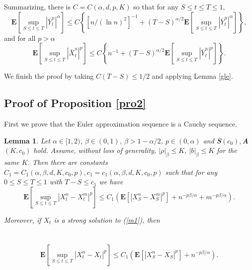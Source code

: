 \documentclass[11pt]{amsart}
\theoremstyle{plain}
\newtheorem{lemma}{Lemma}
\numberwithin{equation}{section}
\begin{document}
Summarizing, there is $C=C\left( \alpha,d ,p,K\right) $ so that for any $S\leq t\leq T\leq 1,$\begin{equation*}
\mathbf{E}\left[ \sup_{S\leq t\leq T}\left\vert \bar{Y}_{t}^{n}\right\vert
^{\alpha }\right] \leq C\left\{ \left[ n/\left( \ln n\right) ^{2}\right]
^{-1}+\left( T-S\right) ^{\alpha /2}\mathbf{E}\left[ \sup_{S\leq t\leq
T}\left\vert \bar{Y}_{t}^{n}\right\vert ^{\alpha }\right] \right\} ,
\end{equation*}and for all $p>\alpha $ 
\begin{equation*}
\mathbf{E}\left[ \sup_{S\leq t\leq T}\left\vert \bar{X}_{t}^{n}\right\vert
^{p}\right] \leq C\left\{ n^{-1}+\left( T-S\right) ^{\alpha /2}\mathbf{E}\left[ \sup_{S\leq t\leq T}\left\vert \bar{Y}_{t}^{n}\right\vert ^{p}\right]
\right\} .
\end{equation*}

We finish the proof by taking $C\left( T-S\right) \leq 1/2$ and applying
Lemma \ref{gle}.

\subsection{Proof of Proposition \protect\ref{pro2}}

First we prove that the Euler approximation sequence is a Cauchy sequence.

\begin{lemma}
\label{lem6}Let $\alpha \in \lbrack 1,2)$, $\beta \in (0,1)$, $\beta
>1-\alpha /2$, $p\in \left( 0,\alpha \right) $ and \textbf{S}$\left(
c_{0}\right) ,$\textbf{A}$(K,c_{0})$ hold. Assume, without loss of
generality, $\left\vert \rho \right\vert _{\beta }\leq K$, $\left\vert
b\right\vert _{\beta }\leq K$ for the same $K$. Then there are constants $C_{1}=C_{1}\left( \alpha ,\beta ,d,K,c_{0},p\right) ,c_{1}=c_{1}\left(
\alpha ,\beta ,d,K,c_{0},p\right) $ such that for any $0\leq S\leq T\leq 1$
with $T-S\leq c_{1}$ we have\begin{equation*}
\mathbf{E}\left[ \sup_{S\leq t\leq T}\left\vert
X_{t}^{n}-X_{t}^{m}\right\vert ^{p}\right] \leq C_{1}\left( \mathbf{E}\left[
\left\vert X_{S}^{n}-X_{S}^{m}\right\vert ^{p}\right] +n^{-p\beta /\alpha
}+m^{-p\beta /\alpha }\right) .
\end{equation*}

Moreover, if $X_{t}$ is a strong solution to (\ref{m1}), then \ \ \ \ \ \ \
\ \ \ \ \ \ \ \ \ \ \ \ \ \ \ \ \ \ \ \ \ \ \ \ \ \ \ \ \ \ \ \ \ \ \ \ \ \
\ \ \ \ \ \ \ \ \ \ \ \ \ \ \ \ \ \ \ \ \ \ \ \ \ \ \ \ \ \ \ 
\begin{equation*}
\mathbf{E}\left[ \sup_{S\leq t\leq T}\left\vert X_{t}^{n}-X_{t}\right\vert
^{p}\right] \leq C_{1}\left( \mathbf{E}\left[ \left\vert
X_{S}^{n}-X_{S}\right\vert ^{p}\right] +n^{-p\beta /\alpha }\right) .
\end{equation*}
\end{lemma}
\end{document}
